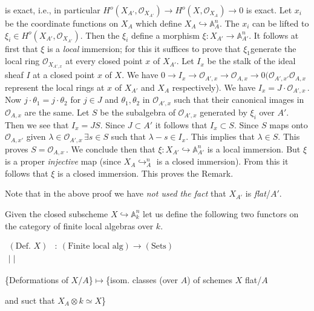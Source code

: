is exact, i.e., in particular $H^{o}(X_{A'}, \mathscr{O}_{X_{A'}})\to H^{o}(X, \mathscr{O}_{X_{A}})\to 0$ is exact. Let $x_{i}$ be the coordinate functions on $X_{A}$ which define $X_{A}\hookrightarrow \mathbb{A}_{A}^{n}$. The $x_{i}$ can be lifted to $\xi_{i}\in H^{o}(X_{A'}, \mathscr{O}_{X_{A'}})$. Then the $\xi_{i}$ define a morphism $\xi:X_{A'}\to \mathbb{A}_{A'}^{n}$. It follows at first that $\xi$ is a {\em local} immersion; for this it suffices to prove that $\xi_{1}$\pageoriginale generate the local ring $\mathscr{O}_{X_{A',x}}$ at every closed point $x$ of $X_{A'}$. Let $I_{x}$ be the stalk of the ideal sheaf $I$ at a closed point $x$ of $X$. We have $0\to I_{x}\to \mathscr{O}_{A',x}\to\mathscr{O}_{A, x}\to 0(\mathscr{O}_{A', x'}\mathscr{O}_{A, x}$ represent the local rings at $x$ of $X_{A'}$ and $X_{A}$ respectively). We have $I_{x}=J\cdot\mathscr{O}_{A',x^{\cdot}}$. Now $j\cdot\theta_{1}=j\cdot\theta_{2}$ for $j \in J$ and $\theta_{1}, \theta_{2}$ in $\mathscr{O}_{A', x}$ such that their canonical images in $\mathscr{O}_{A, x}$ are the same. Let $S$ be the subalgebra of $\mathscr{O}_{A', x}$ generated by $\xi_{i}$ over $A'$. Then we see that $I_{x}=JS$. Since $J\subset A'$ it follows that $I_{x}\subset S$. Since $S$ maps onto $\mathscr{O}_{A, x'}$ given $\lambda\in\mathscr{O}_{A', x^{\cdot}}\exists s \in S$ such that $\lambda-s\in I_{x}$. This implies that $\lambda\in S$. This proves $S=\mathscr{O}_{A, x^{\cdot}}$. We conclude then that $\xi:X_{A'}\hookrightarrow \mathbb{A}_{A'}^{n}$ is a local immersion. But $\xi$ is a proper {\em injective} map (since $X_{A}\hookrightarrow_{A}^{n}$ is a closed immersion). From  this it follows that $\xi$ is a closed immersion. This proves the Remark.

Note that in the above proof we have {\em not used the fact} that $X_{A'}$ is {\em flat}/$A'$.

Given the closed subscheme $X\hookrightarrow \mathbb{A}_{k}^{n}$ let us define the following two functors on the category of finite local algebras over $k$.

\medskip
\noindent
$
\begin{matrix}
(\text{Def. } X) & : ~ (\text{Finite local alg}) \to (\text{Sets})\\
  | \; |
\end{matrix}
$

\noindent
\{Deformations of $X/A$\}$\mapsto$\{isom. classes (over $A$) of schemes $X$ flat/$A$ 

\hfill 
and  suct that $X_{A}\otimes k\simeq X$\}

